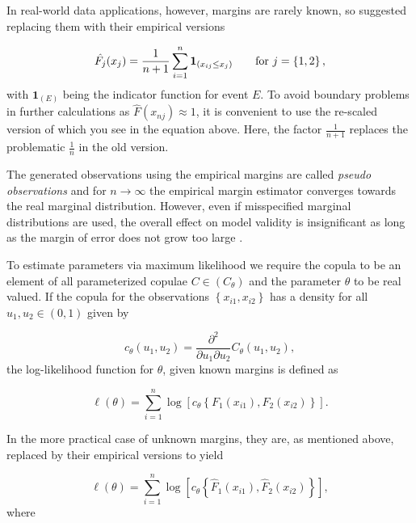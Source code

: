 In real-world data applications, however, margins are rarely known, so \citet{oakes1994multivariate} suggested replacing them with their empirical versions

\begin{equation}
	\label{emp-margins}
	\hat{F_j}(x_j)=\frac{1}{n+1} \sum_{i=1}^{n} \mathbf{1}_{\left(x_{ij} \leq x_j\right)} \text{\qquad for } j = \left\lbrace 1,2 \right\rbrace ,
\end{equation}
%
with $\mathbf{1}_{(E)}$ being the indicator function for event $E$. To avoid boundary problems in further calculations as $\hat{F}(x_{nj}) \approx 1$, it is convenient to use the re-scaled version of \citet{genest1995semiparametric} which you see in the equation above. Here, the factor $\frac{1}{n+1}$ replaces the problematic $\frac{1}{n}$ in the old version.

The generated observations using the empirical margins are called \textit{pseudo observations} and for $n \rightarrow \infty$ the empirical margin estimator converges towards the real marginal distribution. However, even if misspecified marginal distributions are used, the overall effect on model validity is insignificant as long as the margin of error does not grow too large \citep{kim2007comparison}.

To estimate parameters via maximum likelihood we require the copula to be an element of all parameterized copulae $C \in (C_\theta)$ and the parameter $\theta$ to be real valued. If the copula for the observations $\left\lbrace x_{i1},x_{i2}\right\rbrace$ has a density for all $u_1,u_2 \in (0,1)$ given by 

\begin{equation*}
	c_{\theta}(u_1, u_2)=\frac{\partial^{2}}{\partial u_1 \partial u_2} C_{\theta}(u_1, u_2),
\end{equation*}
%
the log-likelihood function for $\theta$, given known margins is defined as

\begin{equation}
	\ell(\theta)=\sum_{i=1}^{n} \log \left[c_{\theta}\left\{F_1\left(x_{i1}\right), F_2\left(x_{i2}\right)\right\}\right].
\end{equation}

In the more practical case of unknown margins, they are, as mentioned above, replaced by their empirical versions to yield 

\begin{equation}
	\ell(\theta)=\sum_{i=1}^{n} \log \left[c_{\theta}\left\{\hat{F}_1\left(x_{i1}\right), \hat{F}_2\left(x_{i2}\right)\right\}\right],
\end{equation}
%
where

